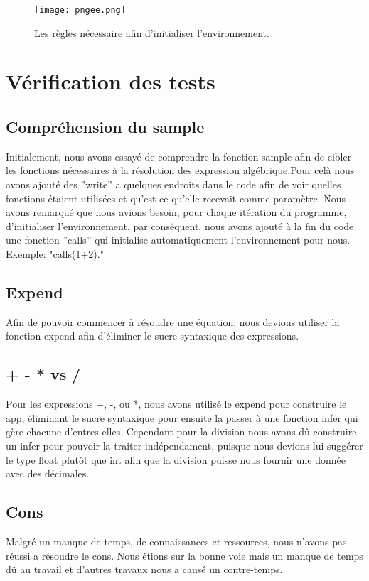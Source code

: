 \documentclass[a4paper]{article}
\begin{document}
\begin{figure}
\centering
\texttt{[image: pngee.png]}
\caption{\label{fig:data}Les règles nécessaire afin d'initialiser l'environnement.}
\end{figure}


\section{Vérification des tests}
\subsection{Compréhension du sample}
Initialement, nous avons essayé de comprendre la fonction sample afin de cibler les fonctions nécessaires à la résolution des expression algébrique.Pour celà nous avons ajouté des ''write'' a quelques endroits dans le code afin de voir quelles fonctions étaient utilisées et qu'est-ce qu'elle recevait comme paramètre. Nous avons remarqué que nous avions besoin, pour chaque itération du programme, d'initialiser l'environnement, par conséquent, nous avons ajouté à la fin du code une fonction ''calls'' qui initialise automatiquement l'environnement pour nous. Exemple: "calls(1+2)."
\subsection{Expend}
Afin de pouvoir commencer à résoudre une équation,  nous devions utiliser la fonction expend afin d'éliminer le sucre syntaxique des expressions.
\subsection{+ - * vs /}
Pour les expressions +, -, ou *, nous avons utilisé le expend pour construire le  app, éliminant le sucre syntaxique pour ensuite la passer à une fonction infer qui gère chacune d'entres elles. Cependant pour la division nous avons dû construire un infer pour pouvoir la traiter indépendament, puisque nous devions lui suggérer le type float plutôt que int afin que la division puisse nous fournir une donnée avec des décimales. 
\subsection{Cons}
Malgré un manque de temps, de connaissances et ressources, nous n'avons pas réussi a résoudre le cons. Nous étions sur la bonne voie mais un manque de temps dû au travail et d'autres travaux nous a causé un contre-temps.
\end{document}
